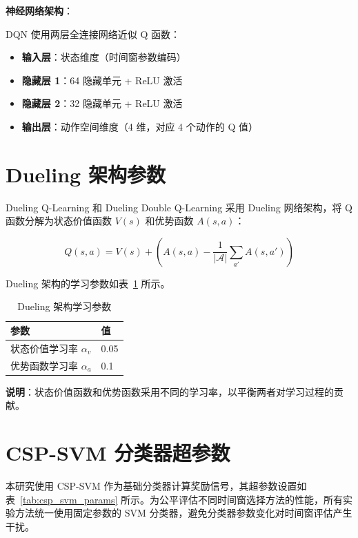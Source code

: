 \noindent\textbf{神经网络架构}：

DQN 使用两层全连接网络近似 Q 函数：
\begin{itemize}
    \item \textbf{输入层}：状态维度（时间窗参数编码）
    \item \textbf{隐藏层 1}：64 隐藏单元 + ReLU 激活
    \item \textbf{隐藏层 2}：32 隐藏单元 + ReLU 激活
    \item \textbf{输出层}：动作空间维度（4 维，对应 4 个动作的 Q 值）
\end{itemize}

\section{Dueling 架构参数}
\label{sec:dueling_params}

Dueling Q-Learning 和 Dueling Double Q-Learning 采用 Dueling 网络架构，将 Q 函数分解为状态价值函数 $V(s)$ 和优势函数 $A(s,a)$：

\begin{equation}
Q(s, a) = V(s) + \left( A(s, a) - \frac{1}{|\mathcal{A}|} \sum_{a'} A(s, a') \right)
\end{equation}

Dueling 架构的学习参数如表~\ref{tab:dueling_params} 所示。

\begin{table}[H]
\centering
\caption{Dueling 架构学习参数}
\label{tab:dueling_params}
\begin{tabular}{ll}
\hline
\textbf{参数} & \textbf{值} \\
\hline
状态价值学习率 $\alpha_v$ & 0.05 \\
优势函数学习率 $\alpha_a$ & 0.1 \\
\hline
\end{tabular}
\end{table}

\noindent\textbf{说明}：状态价值函数和优势函数采用不同的学习率，以平衡两者对学习过程的贡献。

\section{CSP-SVM 分类器超参数}
\label{sec:csp_svm_params}

本研究使用 CSP-SVM 作为基础分类器计算奖励信号，其超参数设置如表~\ref{tab:csp_svm_params} 所示。为公平评估不同时间窗选择方法的性能，所有实验方法统一使用固定参数的 SVM 分类器，避免分类器参数变化对时间窗评估产生干扰。

